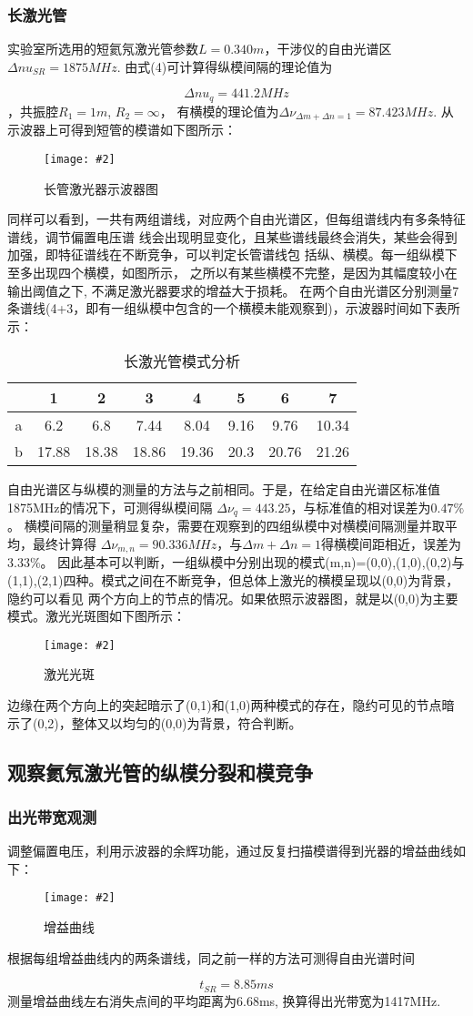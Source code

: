 \documentclass[12pt,a4paper]{article}
\newcommand{\be}[1]{
    \begin{equation}
        #1
    \end{equation}
}
\newcommand{\bfig}[3]{
    \begin{figure}[H]
        \centering
        \texttt{[image: \#2]}
        \caption{#3}
    \end{figure}
}
\begin{document}
\subsubsection{长激光管}
实验室所选用的短氦氖激光管参数$L=0.340m$，干涉仪的自由光谱区$\Delta nu_{SR}=1875MHz$. 由式(4)可计算得纵模间隔的理论值为
\be{\Delta nu_q=441.2MHz}，共振腔$R_1=1m$, $R_2=\infty$， 有横模的理论值为$\Delta \nu_{\Delta m+\Delta n=1}=87.423MHz$.
从示波器上可得到短管的模谱如下图所示：
\bfig{0.6}{长管激光器示意图.jpeg}{长管激光器示波器图}
同样可以看到，一共有两组谱线，对应两个自由光谱区，但每组谱线内有多条特征谱线，调节偏置电压谱
线会出现明显变化，且某些谱线最终会消失，某些会得到加强，即特征谱线在不断竞争，可以判定长管谱线包
括纵、横模。每一组纵模下至多出现四个横模，如图所示，
之所以有某些横模不完整，是因为其幅度较小在输出阈值之下, 不满足激光器要求的增益大于损耗。
在两个自由光谱区分别测量7条谱线(4+3，即有一组纵模中包含的一个横模未能观察到)，示波器时间如下表所示：
\\
\begin{table}[H]
    \centering
    \caption{长激光管模式分析}
    \begin{tabular}{|c|c|c|c|c|c|c|c|}
    \hline
      & 1     & 2     & 3     & 4     & 5    & 6     & 7     \\ \hline
    a & 6.2   & 6.8   & 7.44  & 8.04  & 9.16 & 9.76  & 10.34 \\ \hline
    b & 17.88 & 18.38 & 18.86 & 19.36 & 20.3 & 20.76 & 21.26 \\ \hline
    \end{tabular}
    \end{table}
自由光谱区与纵模的测量的方法与之前相同。于是，在给定自由光谱区标准值1875MHz的情况下，可测得纵模间隔
$\Delta \nu_q=443.25$，与标准值的相对误差为$0.47\%$。
横模间隔的测量稍显复杂，需要在观察到的四组纵模中对横模间隔测量并取平均，最终计算得
$\Delta \nu_{m,n}=90.336MHz$，与$\Delta m+\Delta n=1$得横模间距相近，误差为$3.33\%$。
因此基本可以判断，一组纵模中分别出现的模式(m,n)=(0,0),(1,0),(0,2)与(1,1),(2,1)四种。模式之间在不断竞争，但总体上激光的横模呈现以(0,0)为背景，隐约可以看见
两个方向上的节点的情况。如果依照示波器图，就是以(0,0)为主要模式。激光光斑图如下图所示：
\bfig{0.5}{激光光斑.jpg}{激光光斑}
边缘在两个方向上的突起暗示了(0,1)和(1,0)两种模式的存在，隐约可见的节点暗示了(0,2)，整体又以均匀的(0,0)为背景，符合判断。
\subsection{观察氦氖激光管的纵模分裂和模竞争}
\subsubsection{出光带宽观测}
调整偏置电压，利用示波器的余辉功能，通过反复扫描模谱得到光器的增益曲线如下：
\bfig{0.7}{增益曲线.jpeg}{增益曲线}
根据每组增益曲线内的两条谱线，同之前一样的方法可测得自由光谱时间
\be{t_{SR}=8.85ms}测量增益曲线左右消失点间的平均距离为6.68ms, 换算得出光带宽为1417MHz.
\end{document}
